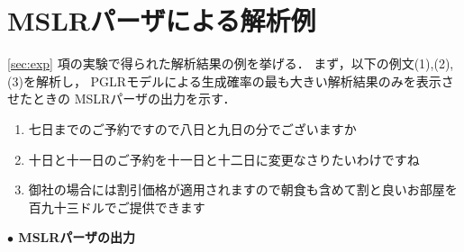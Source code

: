 \appendix

\section{MSLRパーザによる解析例}
\label{sec:appendix}

\ref{sec:exp} 項の実験で得られた解析結果の例を挙げる．
まず，以下の例文(1),(2),(3)を解析し，
PGLRモデルによる生成確率の最も大きい解析結果のみを表示させたときの
MSLRパーザの出力を示す．
\begin{enumerate}
\item 七日までのご予約ですので八日と九日の分でございますか
\item 十日と十一日のご予約を十一日と十二日に変更なさりたいわけですね
\item 御社の場合には割引価格が適用されますので朝食も含めて割と良いお部屋を百九十三ドルでご提供できます
\end{enumerate}

\begin{flushleft}
  \bf $\bullet$ MSLRパーザの出力
\end{flushleft}

